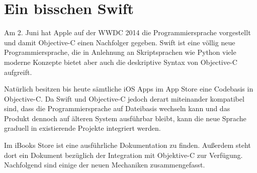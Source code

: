 \documentclass[parskip=half, final]{scrreprt}
\begin{document}
\section{Ein bisschen Swift}

Am 2. Juni hat Apple auf der WWDC 2014 die Programmiersprache  vorgestellt und damit Objective-C einen Nachfolger gegeben. Swift ist eine völlig neue Programmiersprache, die in Anlehnung an Skriptsprachen wie Python viele moderne Konzepte bietet aber auch die deskriptive Syntax von Objective-C aufgreift.

Natürlich besitzen bis heute sämtliche iOS Apps im App Store eine Codebasis in Objective-C. Da Swift und Objective-C jedoch derart miteinander kompatibel sind, dass die Programmiersprache auf Dateibasis wechseln kann und das Produkt dennoch auf älteren System ausführbar bleibt, kann die neue Sprache graduell in existierende Projekte integriert werden.

Im iBooks Store  ist eine ausführliche Dokumentation zu finden. Außerdem steht dort ein Dokument bezüglich der Integration mit Objektive-C  zur Verfügung. Nachfolgend sind einige der neuen Mechaniken zusammengefasst.
\end{document}
